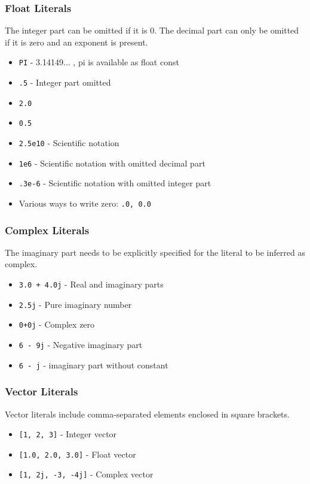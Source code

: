 \subsubsection{Float Literals}
The integer part can be omitted if it is 0. The decimal part can only be omitted if it is zero and an exponent is present.
\begin{itemize}
    \item \texttt{PI} - 3.14149... , pi is available as float const 
    \item \texttt{.5} - Integer part omitted
    \item \texttt{2.0}
    \item \texttt{0.5}
    \item \texttt{2.5e10} - Scientific notation
    \item \texttt{1e6} - Scientific notation with omitted decimal part
    \item \texttt{.3e-6} - Scientific notation with omitted integer part
    \item Various ways to write zero: \texttt{.0, 0.0}
\end{itemize}

\subsubsection{Complex Literals}
The imaginary part needs to be explicitly specified for the literal to be inferred as complex.
\begin{itemize}
    \item \texttt{3.0 + 4.0j} - Real and imaginary parts
    \item \texttt{2.5j} - Pure imaginary number
    \item \texttt{0+0j} - Complex zero
    \item \texttt{6 - 9j} - Negative imaginary part
    \item \texttt{6 - j} -  imaginary part without constant
\end{itemize}

\subsubsection{Vector Literals}
Vector literals include comma-separated elements enclosed in square brackets.
\begin{itemize}
    \item \texttt{[1, 2, 3]} - Integer vector
    \item \texttt{[1.0, 2.0, 3.0]} - Float vector
    \item \texttt{[1, 2j, -3, -4j]} - Complex vector
\end{itemize}

